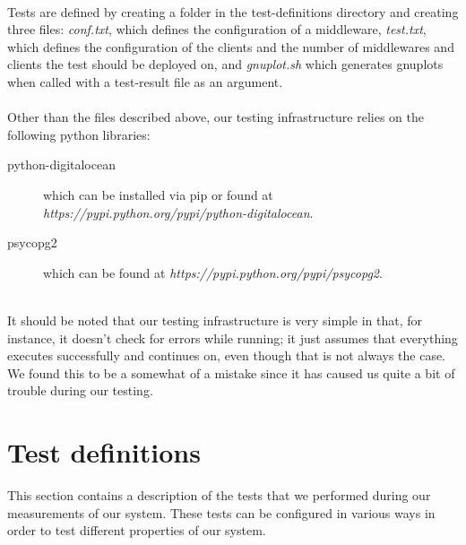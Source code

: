 \documentclass{article}
\begin{document}
        ~\\
        Tests are defined by creating a folder in the test-definitions directory and creating three files: \textit{conf.txt}, which defines the configuration of a middleware, \textit{test.txt}, which defines the configuration of the clients and the number of middlewares and clients the test should be deployed on, and \textit{gnuplot.sh} which generates gnuplots when called with a test-result file as an argument.\\
        \\
        Other than the files described above, our testing infrastructure relies on the following python libraries: 
        \begin{description}
            \item[python-digitalocean] which can be installed via pip or found at \textit{https://pypi.python.org/pypi/python-digitalocean}.
            \item[psycopg2] which can be found at \textit{https://pypi.python.org/pypi/psycopg2}.
        \end{description}
        ~\\
        It should be noted that our testing infrastructure is very simple in that, for instance, it doesn't check for errors while running; it just assumes that everything executes successfully and continues on, even though that is not always the case. We found this to be a somewhat of a mistake since it has caused us quite a bit of trouble during our testing.

    \section{Test definitions}
        \label{sec:test_definitions}
        This section contains a description of the tests that we performed during our measurements of our system. These tests can be configured in various ways in order to test different properties of our system.
\end{document}
